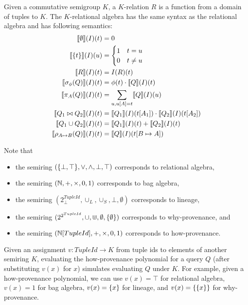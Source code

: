 Given a commutative semigroup $K$, a $K$-relation $R$ is a function from a
domain of tuples to $K$. The $K$-relational algebra has the same syntax as the
relational algebra and has following semantics:
\begin{align*}
  \llbracket\emptyset\rrbracket(I)(t) &= 0 \\
  \llbracket\{t\}\rrbracket(I)(u) &= \begin{cases}
    1 & t = u \\
    0 & t \neq u
  \end{cases} \\
  \llbracket R\rrbracket(I)(t) &= I(R)(t) \\
  \llbracket\sigma_\phi(Q)\rrbracket(I)(t) &= \phi(t) \cdot \llbracket Q\rrbracket(I)(t) \\
  \llbracket\pi_A(Q)\rrbracket(I)(t) &= \sum_{u, u[A] = t} \llbracket Q\rrbracket(I)(u)\\
  \llbracket Q_1 \bowtie Q_2\rrbracket(I)(t) &= \llbracket Q_1\rrbracket(I)(t[A_1]) \cdot \llbracket Q_2\rrbracket(I)(t[A_2]) \\
  \llbracket Q_1 \cup Q_2\rrbracket(I)(t) &= \llbracket Q_1\rrbracket(I)(t) + \llbracket Q_2\rrbracket(I)(t) \\
  \llbracket\rho_{A \mapsto B}(Q)\rrbracket(I)(t) &= \llbracket Q\rrbracket(I)(t[B \mapsto A])
\end{align*}

Note that
\begin{itemize}
  \item
    the semiring $(\{\bot, \top\}, \lor, \land, \bot, \top)$ corresponds to
    relational algebra,
  \item
    the semiring $(\mathbb{N}, +, \times, 0, 1)$ corresponds to bag algebra,
  \item
    the semiring $(2^{TupleId}_\bot, \cup_L, \cup_S, \bot, \emptyset)$
    corresponds to lineage,
  \item
    the semiring $(2^{2^{TupleId}}, \cup, \Cup, \emptyset, \{\emptyset\})$
    corresponds to why-provenance, and
  \item
    the semiring $(\mathbb{N}[TupleId], +, \times, 0, 1)$ corresponds to
    how-provenance.
\end{itemize}

Given an assignment $v: TupleId \to K$ from tuple ids to elements of another
semiring $K$, evaluating the how-provenance polynomial for a query $Q$ (after
substituting $v(x)$ for $x$) simulates evaluating $Q$ under $K$. For example,
given a how-provenance polynomial, we can use $v(x) = \top$ for relational
algebra, $v(x) = 1$ for bag algebra, $v(x) = \{x\}$ for lineage, and $v(x) =
\{\{x\}\}$ for why-provenance.

